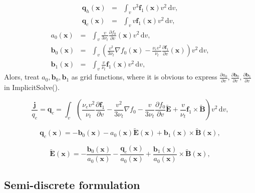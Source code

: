 \documentclass[preprint,12pt]{elsarticle}
\newcommand{\pdv}[2]{\frac{\partial{#1}}{\partial{#2}}}
\newcommand{\vect}[1]{\boldsymbol{#1}}
\newcommand{\dI}{\text{d}}
\newcommand{\nue}{\nu_{e}}
\newcommand{\nutot}{\nu_{t}}
\newcommand{\vmag}{v}
\newcommand{\tE}{\vect{\tilde{E}}}
\newcommand{\tB}{\vect{\tilde{B}}}
\newcommand{\qe}{q_e}
\newcommand{\fzero}{f_0}
\newcommand{\fone}{\vect{f}_1}
\newcommand{\intv}{\int_{\vmag}}
\newcounter{bla}
\begin{document}
\begin{eqnarray}
  \vect{q}_h(\vect{x}) &=& \intv
  \vmag^3 \fone(\vect{x}) \vmag^2\, \dI\vmag , \nonumber \\
  \vect{q}_c(\vect{x}) &=& \intv
  \vmag\fone(\vect{x}) \vmag^2\, \dI\vmag , \nonumber 
\end{eqnarray}
\begin{eqnarray}
  a_0(\vect{x}) &=& \intv\frac{\vmag}{3 \nutot} \pdv{\fzero}{\vmag}(\vect{x})
  \vmag^2\, \dI\vmag , \nonumber \\
  \vect{b}_{0}(\vect{x}) &=& \intv\left(  
  \frac{\vmag^2}{3 \nutot}\nabla\fzero(\vect{x})
  - \frac{\nue\vmag^2}{\nutot}\pdv{\fone}{\vmag}(\vect{x})
  \right)\vmag^2\, \dI\vmag , \nonumber \\
  \vect{b}_{1}(\vect{x}) &=& \intv
  \frac{\vmag}{\nutot}\fone(\vect{x})
  \vmag^2\, \dI\vmag , \nonumber
\end{eqnarray}
Alors, treat $a_0, \vect{b}_{0}, \vect{b}_1$ as grid functions, 
where it is obvious to express 
$\pdv{a_0}{\vmag}, \pdv{\vect{b}_{0}}{\vmag}, \pdv{\vect{b}_1}{\vmag}$ in 
ImplicitSolve().

\begin{equation}
  \frac{\vect{j}}{\qe} = \vect{q}_c =
  \intv \left(\frac{\nue\vmag^2}{\nutot}\pdv{\fone}{\vmag}
  - \frac{\vmag^2}{3\nutot}\nabla\fzero - 
  \frac{\vmag}{3\nutot}\pdv{\fzero}{\vmag}\tE
   + \frac{\vmag}{\nutot}\fone\times\tB\right) \vmag^2\, \dI\vmag ,
  \label{eq:HOFcurrent}
\end{equation}

\begin{equation}
  \vect{q}_c(\vect{x}) 
  = -\vect{b}_{0}(\vect{x}) 
  - a_{0}(\vect{x})\tE(\vect{x})
   + \vect{b}_{1}(\vect{x})\times\tB(\vect{x}) ,
  \label{eq:HOFcurrent}
\end{equation}

\begin{equation}
  \tE(\vect{x}) = -\frac{\vect{b}_{0}(\vect{x})}{a_{0}(\vect{x})} 
  - \frac{\vect{q}_c(\vect{x})}{a_{0}(\vect{x})}
   + \frac{\vect{b}_{1}(\vect{x})}{a_{0}(\vect{x})}\times\tB(\vect{x}) ,
  \label{eq:HOFcurrent}
\end{equation}

\subsection{Semi-discrete formulation}\label{sec:semidiscrete_form}
\end{document}
